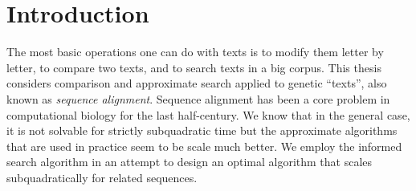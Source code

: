 \graphicspath{{\dir/}}


\chapter{Introduction} \label{ch:introduction}

The most basic operations one can do with texts is to modify them letter by
letter, to compare two texts, and to search texts in a big corpus. This thesis
considers comparison and approximate search applied to genetic ``texts'', also
known as \emph{sequence alignment}. Sequence alignment has been a core problem
in computational biology for the last half-century. We know that in the general
case, it is not solvable for strictly subquadratic time but the approximate
algorithms that are used in practice seem to be scale much better. We employ  
the \A informed search algorithm in an attempt to design an optimal algorithm
that scales subquadratically for related sequences.







